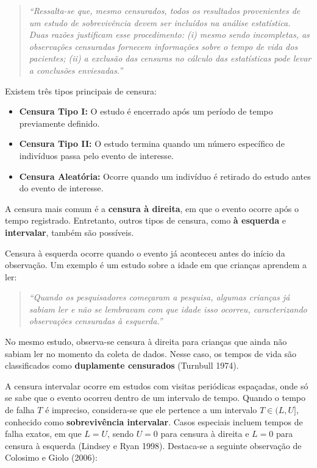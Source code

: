 \documentclass[
  12pt,
  letterpaper,
  DIV=11,
  numbers=noendperiod]{scrreprt}
\providecommand{\tightlist}{%
  \setlength{\itemsep}{0pt}\setlength{\parskip}{0pt}}\usepackage{longtable,booktabs,array}
\begin{document}
\begin{quote}
\emph{``Ressalta-se que, mesmo censurados, todos os resultados
provenientes de um estudo de sobrevivência devem ser incluídos na
análise estatística. Duas razões justificam esse procedimento: (i) mesmo
sendo incompletas, as observações censuradas fornecem informações sobre
o tempo de vida dos pacientes; (ii) a exclusão das censuras no cálculo
das estatísticas pode levar a conclusões enviesadas.''}
\end{quote}

Existem três tipos principais de censura:

\begin{itemize}
\tightlist
\item
  \textbf{Censura Tipo I:} O estudo é encerrado após um período de tempo
  previamente definido.
\item
  \textbf{Censura Tipo II:} O estudo termina quando um número específico
  de indivíduos passa pelo evento de interesse.
\item
  \textbf{Censura Aleatória:} Ocorre quando um indivíduo é retirado do
  estudo antes do evento de interesse.
\end{itemize}

A censura mais comum é a \textbf{censura à direita}, em que o evento
ocorre após o tempo registrado. Entretanto, outros tipos de censura,
como \textbf{à esquerda} e \textbf{intervalar}, também são possíveis.

Censura à esquerda ocorre quando o evento já aconteceu antes do início
da observação. Um exemplo é um estudo sobre a idade em que crianças
aprendem a ler:

\begin{quote}
\emph{``Quando os pesquisadores começaram a pesquisa, algumas crianças
já sabiam ler e não se lembravam com que idade isso ocorreu,
caracterizando observações censuradas à esquerda.''}
\end{quote}

No mesmo estudo, observa-se censura à direita para crianças que ainda
não sabiam ler no momento da coleta de dados. Nesse caso, os tempos de
vida são classificados como \textbf{duplamente censurados} (Turnbull
1974).

A censura intervalar ocorre em estudos com visitas periódicas espaçadas,
onde só se sabe que o evento ocorreu dentro de um intervalo de tempo.
Quando o tempo de falha \(T\) é impreciso, considera-se que ele pertence
a um intervalo \(T \in (L, U]\), conhecido como \textbf{sobrevivência
intervalar}. Casos especiais incluem tempos de falha exatos, em que
\(L = U\), sendo \(U = 0\) para censura à direita e \(L = 0\) para
censura à esquerda (Lindsey e Ryan 1998). Destaca-se a seguinte
observação de Colosimo e Giolo (2006):
\end{document}
